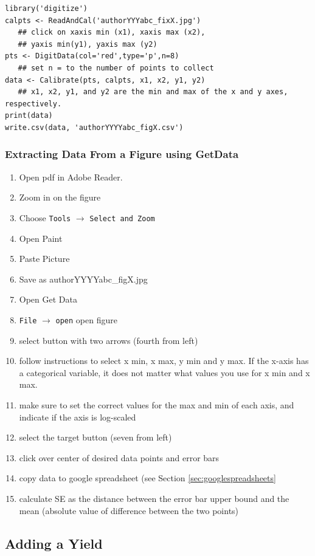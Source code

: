 \documentclass[12pt,english,portrait]{article}
\begin{document}
\begin{verbatim}
library('digitize')
calpts <- ReadAndCal('authorYYYabc_fixX.jpg') 
   ## click on xaxis min (x1), xaxis max (x2), 
   ## yaxis min(y1), yaxis max (y2)
pts <- DigitData(col='red',type='p',n=8)
   ## set n = to the number of points to collect 
data <- Calibrate(pts, calpts, x1, x2, y1, y2)
   ## x1, x2, y1, and y2 are the min and max of the x and y axes, respectively.
print(data)
write.csv(data, 'authorYYYYabc_figX.csv')
\end{verbatim}

\subsubsection{Extracting Data From a Figure using GetData}
\begin{enumerate}
\item Open pdf in Adobe Reader.
\item Zoom in on the figure
\item Choose \verb+Tools+ $\to$ \verb+Select and Zoom+
\item Open Paint
\item Paste Picture
\item Save as authorYYYYabc\_figX.jpg
\item Open Get Data
\item \verb+File+ $\to$ \verb+open+ open figure
\item select button with two arrows (fourth from left)
\item follow instructions to select x min, x max, y min and y max. If the x-axis has a categorical variable, it does not matter what values you use for x min and x max.
\item make sure to set the correct values for the max and min of each axis, and indicate if the axis is log-scaled
\item select the target button (seven from left)
\item click over center of desired data points and error bars
\item copy data to google spreadsheet (see Section \ref{sec:googlespreadsheets}
\item calculate SE as the distance between the error bar upper bound and the mean (absolute value of difference between the two points) 
\end{enumerate}

\subsection{Adding a Yield} 
\end{document}
